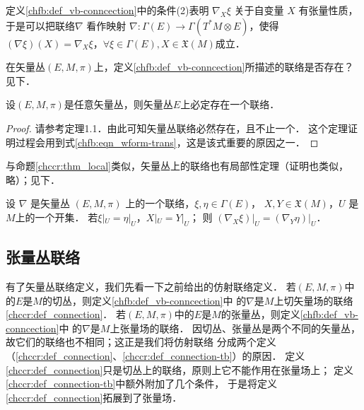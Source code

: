 定义\ref{chfb:def_vb-conncection}中的条件(2)表明 $\nabla_X \xi$ 关于自变量 $X$ 有张量性质，
于是可以把联络$\nabla$ 看作映射 $\nabla: \Gamma(E) \rightarrow \Gamma (T^* M \otimes E )$，使得
$(\nabla \xi)(X)=\nabla_X \xi$，$ \forall \xi \in \Gamma(E), X \in \mathfrak{X}(M) $成立．


在矢量丛$(E,M,\pi)$上，定义\ref{chfb:def_vb-conncection}所描述的联络是否存在？见下．

\begin{theorem}\label{chfb:thm_existence}
    设$(E,M,\pi)$是任意矢量丛，则矢量丛$E$上必定存在一个联络．
\end{theorem}
\begin{proof}
    请参考\parencite[p.104]{cc2001-zh}定理1.1．由此可知矢量丛联络必然存在，且不止一个．
    这个定理证明过程会用到式\eqref{chfb:eqn_wform-trans}，这是该式重要的原因之一．
\end{proof}

与命题\ref{chccr:thm_local}类似，矢量丛上的联络也有局部性定理（证明也类似，略）；见下．
\begin{proposition}
    设 $\nabla$ 是矢量丛 $(E,M,\pi)$ 上的一个联络，$\xi, \eta \in \Gamma(E)$，
    $ X, Y \in \mathfrak{X}(M)$，$U$ 是 $M$上的一个开集． 
    若$ \xi|_U = \eta|_U$，$ X|_U = Y|_U $；
    则 $\left.\left(\nabla_X \xi\right)\right|_U=\left.\left(\nabla_Y \eta\right)\right|_U$．
\end{proposition}

\subsection{张量丛联络}

有了矢量丛联络定义，我们先看一下之前给出的仿射联络定义．
若$(E,M,\pi)$中的$E$是$M$的切丛，则定义\ref{chfb:def_vb-conncection}中
的$\nabla$是$M$上切矢量场的联络\ref{chccr:def_connection}．
若$(E,M,\pi)$中的$E$是$M$的张量丛，则定义\ref{chfb:def_vb-conncection}中
的$\nabla$是$M$上张量场的联络．
因切丛、张量丛是两个不同的矢量丛，故它们的联络也不相同；这正是我们将仿射联络
分成两个定义（\ref{chccr:def_connection}、\ref{chccr:def_connection-tb}）的原因．
定义\ref{chccr:def_connection}只是切丛上的联络，原则上它不能作用在张量场上；
定义\ref{chccr:def_connection-tb}中额外附加了几个条件，
于是将定义\ref{chccr:def_connection}拓展到了张量场．



